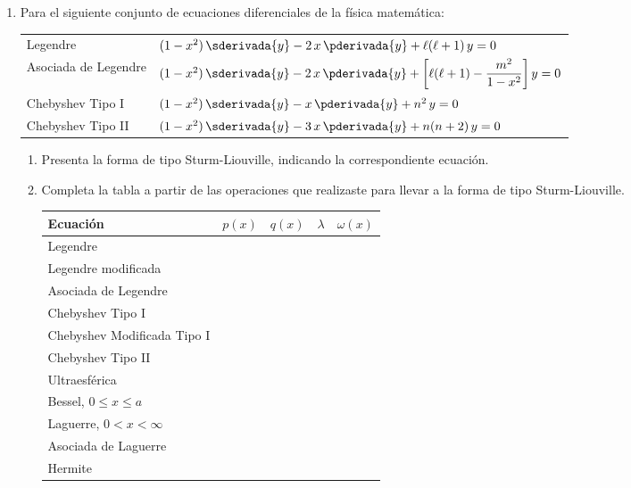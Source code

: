 \begin{enumerate}
\item Para el siguiente conjunto de ecuaciones diferenciales de la física matemática:
\begin{table}[H]
\begin{tabular}{l l}
Legendre & $(1 -x^{2}) \, \sderivada{y} - 2 \, x \, \pderivada{y} + \ell (\ell + 1) \, y = 0$ \\
Asociada de Legendre & $(1 -x^{2}) \, \sderivada{y} - 2 \, x \, \pderivada{y} + \bigg[ \ell (\ell + 1) - \dfrac{m^{2}}{1 -x^{2}} \bigg] \, y = 0$ \\
Chebyshev Tipo I & $(1 -x^{2}) \, \sderivada{y} - x \, \pderivada{y} + n^{2} \, y = 0$ \\
Chebyshev Tipo II & $(1 -x^{2}) \, \sderivada{y} - 3 \, x \, \pderivada{y} + n(n +2) \, y = 0$ \\
\end{tabular}
\end{table}
\begin{enumerate}
\item Presenta la forma de tipo Sturm-Liouville, indicando la correspondiente ecuación.
\item Completa la tabla a partir de las operaciones que realizaste para llevar a la forma de tipo Sturm-Liouville.
\begin{table}[H]
\centering
\begin{tabular}{l p{3cm} p{2cm} p{1.5cm} p{1.5cm}}
Ecuación & $p (x)$ & $q (x)$ & $\lambda$ & $\omega (x)$ \\ \hline
Legendre & & & & \\
Legendre modificada & & & & \\
Asociada de Legendre & & & & \\
Chebyshev Tipo I & & & & \\
Chebyshev Modificada Tipo I & & & & \\
Chebyshev Tipo II & & & & \\
Ultraesférica & & & & \\
Bessel, $0 \leq x \leq a$ & & & & \\
Laguerre, $0 < x < \infty$ & & & & \\
Asociada de Laguerre & & & & \\
Hermite & & & & \\
\end{tabular}
\end{table}
\end{enumerate}
\end{enumerate}




